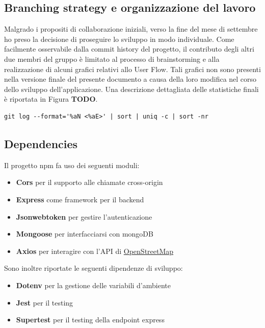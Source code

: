 \documentclass[9pt]{extarticle}
\begin{document}
\subsection{Branching strategy e organizzazione del lavoro}

Malgrado i propositi di collaborazione iniziali, verso la fine del mese di
settembre ho preso la decisione di proseguire lo sviluppo in modo individuale.
Come facilmente osservabile dalla commit history del progetto, il contributo
degli altri due membri del gruppo è limitato al processo di brainstorming e
alla realizzazione di alcuni grafici relativi allo User Flow. Tali grafici non
sono presenti nella versione finale del presente documento a causa della loro
modifica nel corso dello sviluppo dell'applicazione. Una descrizione dettagliata
delle statistiche finali è riportata in Figura \textbf{TODO}.



\begin{verbatim}
git log --format='%aN <%aE>' | sort | uniq -c | sort -nr
\end{verbatim}



\subsection{Dependencies}

Il progetto npm fa uso dei seguenti moduli:
\begin{itemize}
    \item \textbf{Cors} per il supporto alle chiamate cross-origin
    \item \textbf{Express} come framework per il backend
    \item \textbf{Jsonwebtoken} per gestire l'autenticazione
    \item \textbf{Mongoose} per interfacciarsi con mongoDB
    \item \textbf{Axios} per interagire con l'API di \href{https://www.openstreetmap.org/#map=6/42.09/12.56}{OpenStreetMap}
\end{itemize}

Sono inoltre riportate le seguenti dipendenze di sviluppo:
\begin{itemize}
    \item \textbf{Dotenv} per la gestione delle variabili d'ambiente
    \item \textbf{Jest} per il testing
    \item \textbf{Supertest} per il testing della endpoint express
\end{itemize}
\end{document}
